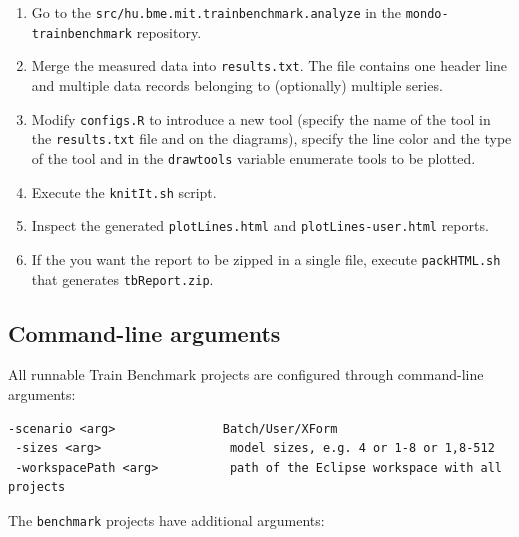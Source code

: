 \begin{enumerate}
  \item Go to the \texttt{src/hu.bme.mit.trainbenchmark.analyze} in the \texttt{mondo-trainbenchmark} repository.
  \item Merge the measured data into \texttt{results.txt}. The file contains one header line and multiple data records belonging to (optionally) multiple series.
  \item Modify \texttt{configs.R} to introduce a new tool (specify the name of the tool in the \texttt{results.txt} file and on the diagrams), specify the line color and the type of the tool and in the \texttt{drawtools} variable enumerate tools to be plotted.
  \item Execute the \texttt{knitIt.sh} script.
  \item Inspect the generated \texttt{plotLines.html} and \texttt{plotLines-user.html} reports.
  \item If the you want the report to be zipped in a single file, execute \texttt{packHTML.sh} that generates \texttt{tbReport.zip}.
\end{enumerate}

\subsection{Command-line arguments}

All runnable Train Benchmark projects are configured through command-line arguments:

\begin{lstlisting}[keywordstyle=\ttfamily]
 -scenario <arg>               Batch/User/XForm
 -sizes <arg>                  model sizes, e.g. 4 or 1-8 or 1,8-512
 -workspacePath <arg>          path of the Eclipse workspace with all projects
\end{lstlisting}

The \texttt{benchmark} projects have additional arguments:

